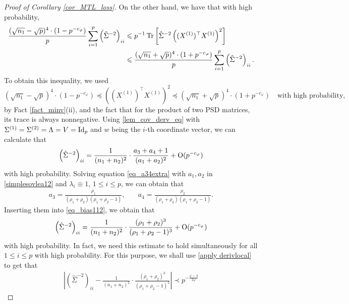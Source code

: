 \begin{proof}[Proof of Corollary \ref{cor_MTL_loss}]
On the other hand, we have that with high probability,
\begin{align}
 \frac{(\sqrt{n_1}-\sqrt{p})^4 \cdot (1- p^{-c_\varphi})}{p}\sum_{i=1}^p \left(\hat \Sigma^{-2}\right)_{ii}  &\leqslant {p}^{-1}\operatorname{Tr}\left[\hat\Sigma^{-2} \left((X^{(1)})^\top X^{(1)} \right)^2\right] \label{eq_bias111}\\ 
 &\leqslant \frac{(\sqrt{n_1}+\sqrt{p})^4 \cdot (1+ p^{-c_\varphi})}{p}\sum_{i=1}^p \left(\hat\Sigma^{-2}\right)_{ii} .\nonumber
\end{align}
To obtain this inequality, we used  
$$ (\sqrt{n_1}-\sqrt{p})^4 \cdot (1-p^{-c_\varphi}) \preceq \left((X^{(1)})^\top X^{(1)} \right)^2 \preceq (\sqrt{n_1}+\sqrt{p})^4 \cdot (1+ p^{-c_\varphi}) \quad \text{with high probability},$$
by Fact \ref{fact_minv}(ii), and the fact that for the product of two PSD matrices, its trace is always nonnegative.
Using \eqref{lem_cov_derv_eq} with $\Sigma^{(1)}=\Sigma^{(2)}=\Lambda=V=\operatorname{Id}_p$ and $w$ being the $i$-th coordinate vector, we can calculate that 
\begin{align}\label{eq_bias112}
 \left(\hat\Sigma^{-2}\right)_{ii} = \frac{1}{(n_1+n_2)^2}\cdot \frac{a_3+a_4+1}{(a_1+a_2)^2} +\operatorname{O}(p^{-c_\varphi})
\end{align}
with high probability. Solving equation \eqref{eq_a34extra} with $a_1, a_2$ in \eqref{simplesovlea12} and $\lambda_i\equiv 1$, $1\le i\le p$, we can obtain that
	\begin{align*}
		a_3 = \frac{\rho_1}{(\rho_1 + \rho_2)(\rho_1 + \rho_2 - 1)}, \quad
		&  a_4 = \frac{\rho_2}{(\rho_1 + \rho_2)(\rho_1 + \rho_2 - 1)}. %
	\end{align*}
Inserting them into \eqref{eq_bias112}, we obtain that 
\begin{align*}%
 \left(\hat\Sigma^{-2}\right)_{ii} = \frac{1}{(n_1+n_2)^2}\cdot \frac{(\rho_1+\rho_2)^3}{(\rho_1+\rho_2-1)^3} +\OO(p^{-c_\varphi})
\end{align*}
with high probability. In fact, we need this estimate to hold simultaneously for all $1\le i \le p$ with high probability. For this purpose, we shall use \eqref{apply derivlocal} to get that 
\begin{align*}%
\left| \left(\hat\Sigma^{-2}\right)_{ii} - \frac{1}{(n_1+n_2)^2}\cdot \frac{(\rho_1+\rho_2)^3}{(\rho_1+\rho_2-1)^3}\right|\prec p^{-\frac{\varphi-4}{2\varphi}}

\end{align*}
\end{proof}
